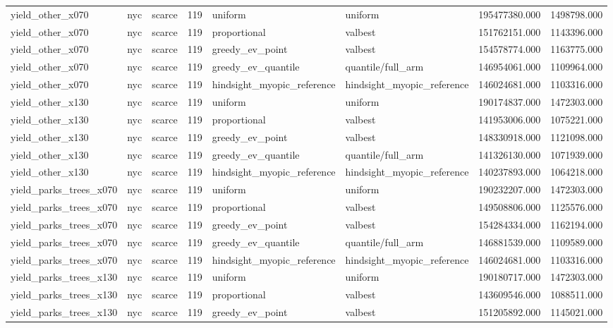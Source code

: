 \begin{tabular}{lllrllrr}
yield\_other\_x070 & nyc & scarce & 119 & uniform & uniform & 195477380.000 & 1498798.000 \\
yield\_other\_x070 & nyc & scarce & 119 & proportional & valbest & 151762151.000 & 1143396.000 \\
yield\_other\_x070 & nyc & scarce & 119 & greedy\_ev\_point & valbest & 154578774.000 & 1163775.000 \\
yield\_other\_x070 & nyc & scarce & 119 & greedy\_ev\_quantile & quantile/full\_arm & 146954061.000 & 1109964.000 \\
yield\_other\_x070 & nyc & scarce & 119 & hindsight\_myopic\_reference & hindsight\_myopic\_reference & 146024681.000 & 1103316.000 \\
yield\_other\_x130 & nyc & scarce & 119 & uniform & uniform & 190174837.000 & 1472303.000 \\
yield\_other\_x130 & nyc & scarce & 119 & proportional & valbest & 141953006.000 & 1075221.000 \\
yield\_other\_x130 & nyc & scarce & 119 & greedy\_ev\_point & valbest & 148330918.000 & 1121098.000 \\
yield\_other\_x130 & nyc & scarce & 119 & greedy\_ev\_quantile & quantile/full\_arm & 141326130.000 & 1071939.000 \\
yield\_other\_x130 & nyc & scarce & 119 & hindsight\_myopic\_reference & hindsight\_myopic\_reference & 140237893.000 & 1064218.000 \\
yield\_parks\_trees\_x070 & nyc & scarce & 119 & uniform & uniform & 190232207.000 & 1472303.000 \\
yield\_parks\_trees\_x070 & nyc & scarce & 119 & proportional & valbest & 149508806.000 & 1125576.000 \\
yield\_parks\_trees\_x070 & nyc & scarce & 119 & greedy\_ev\_point & valbest & 154284334.000 & 1162194.000 \\
yield\_parks\_trees\_x070 & nyc & scarce & 119 & greedy\_ev\_quantile & quantile/full\_arm & 146881539.000 & 1109589.000 \\
yield\_parks\_trees\_x070 & nyc & scarce & 119 & hindsight\_myopic\_reference & hindsight\_myopic\_reference & 146024681.000 & 1103316.000 \\
yield\_parks\_trees\_x130 & nyc & scarce & 119 & uniform & uniform & 190180717.000 & 1472303.000 \\
yield\_parks\_trees\_x130 & nyc & scarce & 119 & proportional & valbest & 143609546.000 & 1088511.000 \\
yield\_parks\_trees\_x130 & nyc & scarce & 119 & greedy\_ev\_point & valbest & 151205892.000 & 1145021.000 \\

\end{tabular}
